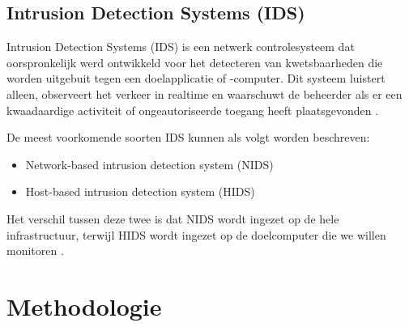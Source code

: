 \subsection{Intrusion Detection Systems (IDS)}

Intrusion Detection Systems (IDS) is een netwerk controlesysteem dat oorspronkelijk werd ontwikkeld voor het detecteren van kwetsbaarheden die worden uitgebuit tegen een doelapplicatie of -computer. Dit systeem luistert alleen, observeert het verkeer in realtime en waarschuwt de beheerder als er een kwaadaardige activiteit of ongeautoriseerde toegang heeft plaatsgevonden \autocite{IBM2023}. 

De meest voorkomende soorten IDS kunnen als volgt worden beschreven:
\begin{itemize}
    \item Network-based intrusion detection system (NIDS)
    \item Host-based intrusion detection system (HIDS)
\end{itemize}

Het verschil tussen deze twee is dat NIDS wordt ingezet op de hele infrastructuur, terwijl HIDS wordt ingezet op de doelcomputer die we willen monitoren \autocite{ Data2023}. 





\section{Methodologie}%
\label{sec:methodologie}

